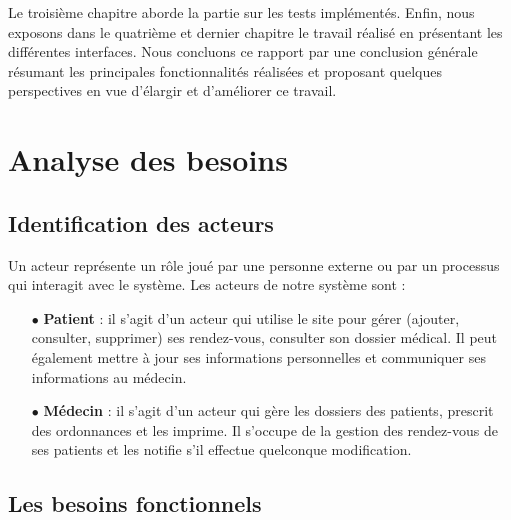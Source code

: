 \documentclass[a4paper]{report}
\begin{document}
Le troisième chapitre aborde la partie sur les tests implémentés.\newline\newline
Enfin, nous exposons dans le quatrième et dernier chapitre le travail réalisé en présentant les différentes interfaces.\newline\newline
Nous concluons ce rapport par une conclusion générale résumant les principales fonctionnalités réalisées et proposant 
quelques perspectives en vue d’élargir et d’améliorer ce travail. 

\chapter{Analyse des besoins}\label{besoins}
\section{Identification des acteurs}

Un acteur représente un rôle joué par une personne externe ou par un processus qui interagit avec le système.
\newline\newline
Les acteurs de notre système sont :
\newline
\begin{itemize}
    \item[$\bullet$] \textbf{Patient} : il s’agit d’un acteur qui utilise le site pour gérer 
    (ajouter, consulter, supprimer) ses rendez-vous, consulter son dossier médical. 
    Il peut également mettre à jour ses informations personnelles et communiquer ses informations au médecin.
    \item[$\bullet$] \textbf{Médecin} : il s’agit d’un acteur qui gère les dossiers des patients, prescrit des ordonnances et 
    les imprime. Il s’occupe de la gestion des rendez-vous de ses patients et les notifie s’il effectue 
    quelconque modification.
  \end{itemize}
  
\section{Les besoins fonctionnels}
\end{document}
